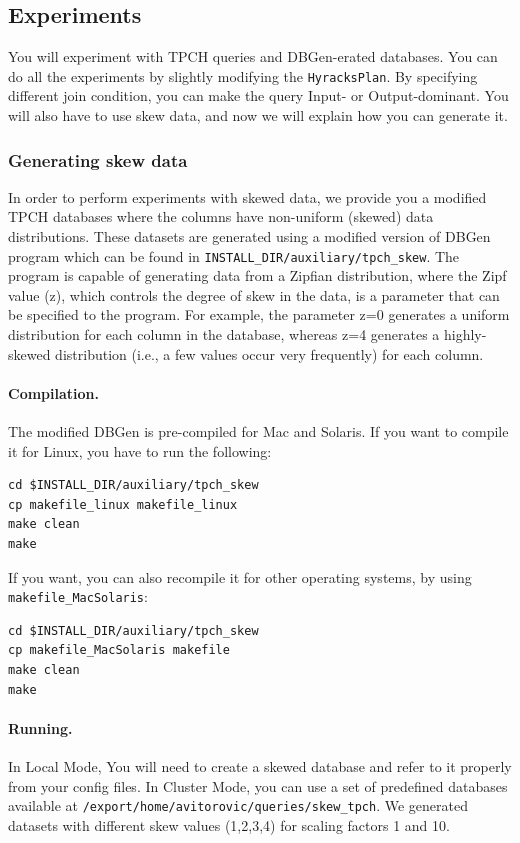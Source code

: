 \documentclass[a4paper,10pt]{article}
\begin{document}
\subsection{Experiments}\label{experiments}
You will experiment with TPCH queries and DBGen-erated databases. You can do all the experiments by slightly modifying the \verb#HyracksPlan#. By specifying different join condition, you can make the query Input- or Output-dominant. You will also have to use skew data, and now we will explain how you can generate it.

\subsubsection{Generating skew data}
In order to perform experiments with skewed data, we provide you a modified TPCH databases where the columns have non-uniform (skewed) data distributions. These datasets are generated using a modified version of DBGen program which can be found in \verb#INSTALL_DIR/auxiliary/tpch_skew#. The program is capable of generating data from a Zipfian distribution, where the Zipf value (z), which controls the degree of skew in the data, is a parameter that can be specified to the program. For example, the parameter z=0 generates a uniform distribution for each column in the database, whereas z=4 generates a highly-skewed distribution (i.e., a few values occur very frequently) for each column.

\paragraph{Compilation.} The modified DBGen is pre-compiled for Mac and Solaris. If you want to compile it for Linux, you have to run the following:
\begin{verbatim}
cd $INSTALL_DIR/auxiliary/tpch_skew
cp makefile_linux makefile_linux
make clean
make
\end{verbatim}

If you want, you can also recompile it for other operating systems, by using \verb#makefile_MacSolaris#:
\begin{verbatim}
cd $INSTALL_DIR/auxiliary/tpch_skew
cp makefile_MacSolaris makefile
make clean
make
\end{verbatim}

\paragraph{Running.} In Local Mode, You will need to create a skewed database and refer to it properly from your config files. In Cluster Mode, you can use a set of predefined databases available at \verb#/export/home/avitorovic/queries/skew_tpch#. We generated datasets with different skew values (1,2,3,4) for scaling factors 1 and 10.
\end{document}
